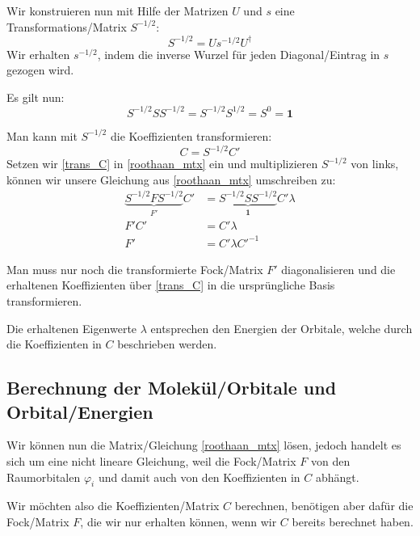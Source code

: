 Wir konstruieren nun mit Hilfe der Matrizen $U$ und $s$ eine Transformations\-/Matrix $S^{-1/2}$:
\begin{equation}
    S^{-1/2} = U s^{-1/2} U^\dagger
\end{equation}
Wir erhalten $s^{-1/2}$, indem die inverse Wurzel für jeden Diagonal\-/Eintrag in $s$ gezogen wird.

Es gilt nun:
\begin{equation}
    S^{-1/2} S S^{-1/2} = S^{-1/2} S^{1/2} = S^{0} = \mathbf{1}
\end{equation}

Man kann mit $S^{-1/2}$ die Koeffizienten transformieren:
\begin{equation}\label{trans_C}
    C = S^{-1/2} C'
\end{equation}
Setzen wir \cref{trans_C} in \cref{roothaan_mtx} ein und multiplizieren $S^{-1/2}$ von links,
können wir unsere Gleichung aus \cref{roothaan_mtx} umschreiben zu:
\begin{equation}
    \begin{aligned}
    \underbrace{S^{-1/2}FS^{-1/2}}_{F'}C' &= \underbrace{S^{-1/2}SS^{-1/2}}_{\mathbf{1}}C'\lambda\\
    F'C' &= C'\lambda\\
    F'&= C'\lambda C'^{-1}
    \end{aligned}
\end{equation}

Man muss nur noch die transformierte Fock\-/Matrix $F'$ diagonalisieren und 
die erhaltenen Koeffizienten über \cref{trans_C} in die ursprüngliche Basis transformieren.

Die erhaltenen Eigenwerte $\lambda$ entsprechen den Energien der Orbitale,
welche durch die Koeffizienten in $C$ beschrieben werden.

\cite[5.2.3.6.2]{lewars_2016}
\cite[S. 142-145]{szabo_ostlund_1996}

\subsection{Berechnung der Molekül\-/Orbitale und Orbital\-/Energien}
Wir können nun die Matrix\-/Gleichung \cref{roothaan_mtx} lösen,
jedoch handelt es sich um eine nicht lineare Gleichung, weil die Fock\-/Matrix $F$
von den Raumorbitalen $\varphi_i$ und damit auch von den Koeffizienten in $C$ abhängt.

Wir möchten also die Koeffizienten\-/Matrix $C$ berechnen,
benötigen aber dafür die Fock\-/Matrix $F$, die wir nur erhalten können,
wenn wir $C$ bereits berechnet haben.

